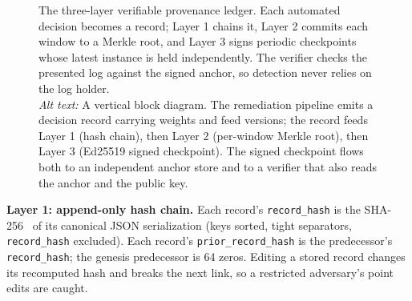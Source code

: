 \documentclass[journal]{IEEEtran}
\begin{document}
\begin{figure}[!t]
\centering
{}
\caption{The three-layer verifiable provenance ledger. Each automated
decision becomes a record; Layer 1 chains it, Layer 2 commits each window to a
Merkle root, and Layer 3 signs periodic checkpoints whose latest instance is
held independently. The verifier checks the presented log against the signed
anchor, so detection never relies on the log holder.\\[2pt]
\textit{Alt text:} A vertical block diagram. The remediation pipeline emits a
decision record carrying weights and feed versions; the record feeds Layer 1
(hash chain), then Layer 2 (per-window Merkle root), then Layer 3 (Ed25519
signed checkpoint). The signed checkpoint flows both to an independent anchor
store and to a verifier that also reads the anchor and the public key.}
\label{fig:arch}
\end{figure}

\textbf{Layer 1: append-only hash chain.} Each record's
\texttt{record\_hash} is the SHA-256~\cite{fips180-4} of its canonical JSON
serialization (keys sorted, tight separators, \texttt{record\_hash}
excluded). Each record's \texttt{prior\_record\_hash} is the predecessor's
\texttt{record\_hash}; the genesis predecessor is 64 zeros. Editing a stored
record changes its recomputed hash and breaks the next link, so a restricted
adversary's point edits are caught.
\end{document}
